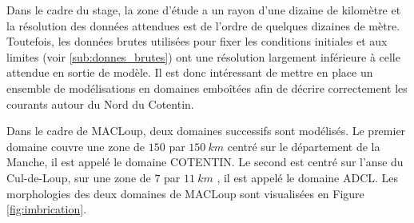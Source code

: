 \documentclass[10pt,a4paper,titlepage]{article}
\begin{document}
Dans le cadre du stage, la zone d'étude a un rayon d'une dizaine de kilomètre et la résolution des données attendues est de l'ordre de quelques dizaines de mètre.
Toutefois, les données brutes utilisées pour fixer les conditions initiales et aux limites (voir \ref{sub:donnes_brutes}) ont une résolution largement inférieure à celle attendue en sortie de modèle.
Il est donc intéressant de mettre en place un ensemble de modélisations en domaines emboîtées afin de décrire correctement les courants autour du Nord du Cotentin.

Dans le cadre de MACLoup, deux domaines successifs sont modélisés.
Le premier domaine couvre une zone de $150$ par $150~km$ centré sur le département de la Manche, il est appelé le domaine COTENTIN.
Le second est centré sur l'anse du Cul-de-Loup, sur une zone de $7$ par $11~km$ , il est appelé le domaine ADCL.
Les morphologies des deux domaines de MACLoup sont visualisées en Figure \ref{fig:imbrication}.
\end{document}

